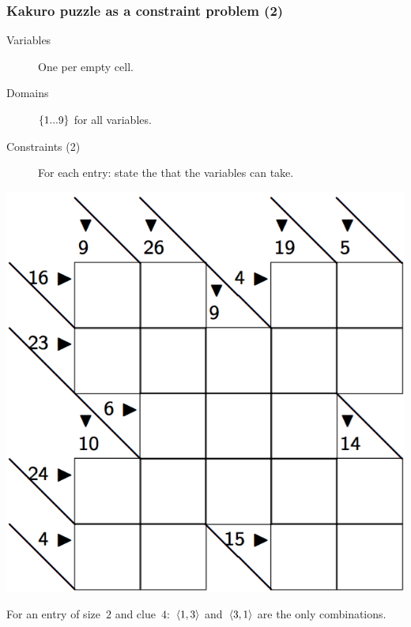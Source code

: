 \documentclass{beamer}
\newcommand{\stressed}[1]{\emph{{\color{red!50}{#1}}}}
\begin{document}
\begin{frame}
  \frametitle{Kakuro puzzle as a constraint problem (2)}
  \begin{minipage}{0.5\textwidth}
    \begin{description}
      \item[Variables] One per empty cell.
      \item[Domains] $\left\{1...9\right\}$ for all variables.
      \item[Constraints (2)] For each entry: state the \stressed{possible
        combinations of values} that the variables can take.
    \end{description} 
  \end{minipage}
  \begin{minipage}{0.45\textwidth}
    \includegraphics[scale=0.2]{kakuro.png}
  \end{minipage}

  \bigskip
  For an entry of size~$2$ and clue~$4$:~$\left\langle1,3\right\rangle$ and~$\left\langle3,1\right\rangle$
  are the only combinations.
\end{frame}
\end{document}
